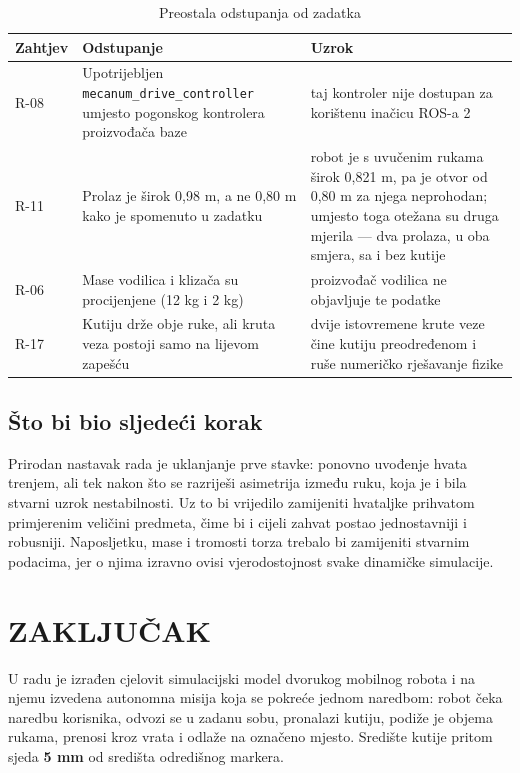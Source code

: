 \documentclass[12pt,a4paper]{article}
\begin{document}
\begin{table}[!htbp]
    \centering
    \caption{Preostala odstupanja od zadatka}
    \label{tab:odstupanja}
    \scriptsize
    \begin{tabularx}{\textwidth}{@{}l X X@{}}
        \toprule
        \textbf{Zahtjev} & \textbf{Odstupanje} & \textbf{Uzrok} \\
        \midrule
        R-08 & Upotrijebljen \texttt{mecanum\_drive\_controller} umjesto pogonskog kontrolera proizvođača baze & taj kontroler nije dostupan za korištenu inačicu ROS-a 2 \\
        R-11 & Prolaz je širok 0,98 m, a ne 0,80 m kako je spomenuto u zadatku & robot je s uvučenim rukama širok 0,821 m, pa je otvor od 0,80 m za njega neprohodan; umjesto toga otežana su druga mjerila --- dva prolaza, u oba smjera, sa i bez kutije \\
        R-06 & Mase vodilica i klizača su procijenjene (12 kg i 2 kg) & proizvođač vodilica ne objavljuje te podatke \\
        R-17 & Kutiju drže obje ruke, ali kruta veza postoji samo na lijevom zapešću & dvije istovremene krute veze čine kutiju preodređenom i ruše numeričko rješavanje fizike \\
        \bottomrule
    \end{tabularx}
\end{table}

\subsection{Što bi bio sljedeći korak}

Prirodan nastavak rada je uklanjanje prve stavke: ponovno uvođenje hvata trenjem, ali tek nakon
što se razriješi asimetrija između ruku, koja je i bila stvarni uzrok nestabilnosti. Uz to bi
vrijedilo zamijeniti hvataljke prihvatom primjerenim veličini predmeta, čime bi i cijeli zahvat
postao jednostavniji i robusniji. Naposljetku, mase i tromosti torza trebalo bi zamijeniti
stvarnim podacima, jer o njima izravno ovisi vjerodostojnost svake dinamičke simulacije.

\section{ZAKLJUČAK}

U radu je izrađen cjelovit simulacijski model dvorukog mobilnog robota i na njemu izvedena
autonomna misija koja se pokreće jednom naredbom: robot čeka naredbu korisnika, odvozi se u
zadanu sobu, pronalazi kutiju, podiže je objema rukama, prenosi kroz vrata i odlaže na označeno
mjesto. Središte kutije pritom sjeda \textbf{5 mm} od središta odredišnog markera.
\end{document}
